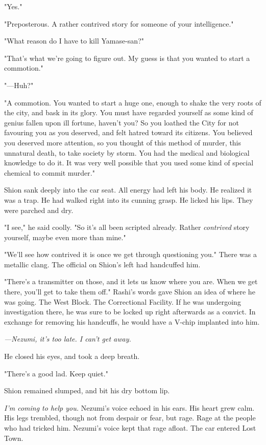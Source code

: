 "Yes."

"Preposterous. A rather contrived story for someone of your
intelligence."

"What reason do I have to kill Yamase-san?"

"That's what we're going to figure out. My guess is that you wanted to
start a commotion."

"---Huh?"

"A commotion. You wanted to start a huge one, enough to shake the very
roots of the city, and bask in its glory. You must have regarded
yourself as some kind of genius fallen upon ill fortune, haven't you? So
you loathed the City for not favouring you as you deserved, and felt
hatred toward its citizens. You believed you deserved more attention, so
you thought of this method of murder, this unnatural death, to take
society by storm. You had the medical and biological knowledge to do it.
It was very well possible that you used some kind of special chemical to
commit murder."

Shion sank deeply into the car seat. All energy had left his body. He
realized it was a trap. He had walked right into its cunning grasp. He
licked his lips. They were parched and dry.

"I see," he said coolly. "So it's all been scripted already. Rather
\emph{contrived} story yourself, maybe even more than mine."

"We'll see how contrived it is once we get through questioning you."
There was a metallic clang. The official on Shion's left had handcuffed
him.

"There's a transmitter on those, and it lets us know where you are. When
we get there, you'll get to take them off." Rashi's words gave Shion an
idea of where he was going. The West Block. The Correctional Facility.
If he was undergoing investigation there, he was sure to be locked up
right afterwards as a convict. In exchange for removing his handcuffs,
he would have a V-chip implanted into him.

\emph{---Nezumi, it's too late. I can't get away.}

He closed his eyes, and took a deep breath.

"There's a good lad. Keep quiet."

Shion remained slumped, and bit his dry bottom lip.

\emph{I'm coming to help you.} Nezumi's voice echoed in his ears. His heart
grew calm. His legs trembled, though not from despair or fear, but rage.
Rage at the people who had tricked him. Nezumi's voice kept that rage
afloat. The car entered Lost Town.

